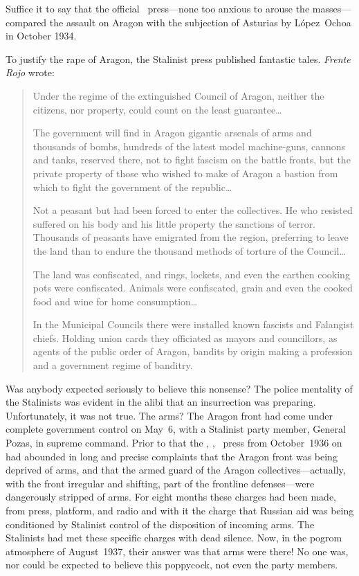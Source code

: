 Suffice it to say that the official \CNT\ press---none too anxious to arouse the masses---compared the assault on Aragon with the subjection of Asturias by L\'opez~Ochoa in October 1934.

To justify the rape of Aragon, the Stalinist press published fantastic tales. \emph{Frente Rojo} wrote:
\begin{quotation}
  Under the regime of the extinguished Council of Aragon, neither the citizens, nor property, could count on the least guarantee\dots
  
  The government will find in Aragon gigantic arsenals of arms and thousands of bombs, hundreds of the latest model machine-guns, cannons and tanks, reserved there, not to fight fascism on the battle fronts, but the private property of those who wished to make of Aragon a bastion from which to fight the government of the republic\dots
  
  Not a peasant but had been forced to enter the collectives. He who resisted suffered on his body and his little property the sanctions of terror. Thousands of peasants have emigrated from the region, preferring to leave the land than to endure the thousand methods of torture of the Council\dots
  
  The land was confiscated, and rings, lockets, and even the earthen cooking pots were confiscated. Animals were confiscated, grain and even the cooked food and wine for home consumption\dots
  
  In the Municipal Councils there were installed known fascists and Falangist chiefs. Holding union cards they officiated as mayors and councillors, as agents of the public order of Aragon, bandits by origin making a profession and a government regime of banditry.
\end{quotation}

Was anybody expected seriously to believe this nonsense? The police mentality of the Stalinists was evident in the alibi that an insurrection was preparing. Unfortunately, it was not true. The arms? The Aragon front had come under complete government control on May~6, with a Stalinist party member, General Pozas, in supreme command. Prior to that the \CNT, \POUM, \FAI\ press from October~1936 on had abounded in long and precise complaints that the Aragon front was being deprived of arms, and that the armed guard of the Aragon collectives---actually, with the front irregular and shifting, part of the frontline defenses---were dangerously stripped of arms. For eight months these charges had been made, from press, platform, and radio and with it the charge that Russian aid was being conditioned by Stalinist control of the disposition of incoming arms. The Stalinists had met these specific charges with dead silence. Now, in the pogrom atmosphere of August~1937, their answer was that arms were there! No one was, nor could be expected to believe this poppycock, not even the party members.

